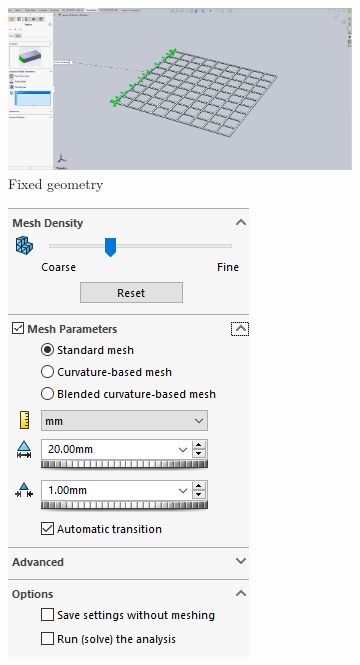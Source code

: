 \documentclass[12pt, letterpaper]{article}
\begin{document}
\begin{figure}[H]
	\centering
	\label{fig:sim-settings}
	\caption{Simulation Parameters}
	\begin{subfigure}[t]{.6\linewidth}
		\includegraphics[width=\linewidth]{./procedure/fixed-geometry}
		\caption{Fixed geometry}
		\label{fig:settings-fixed}
	\end{subfigure}
	\begin{subfigure}[t]{.3\linewidth}
		\includegraphics[width=\linewidth]{./procedure/mesh}

\end{subfigure}
\end{figure}
\end{document}
